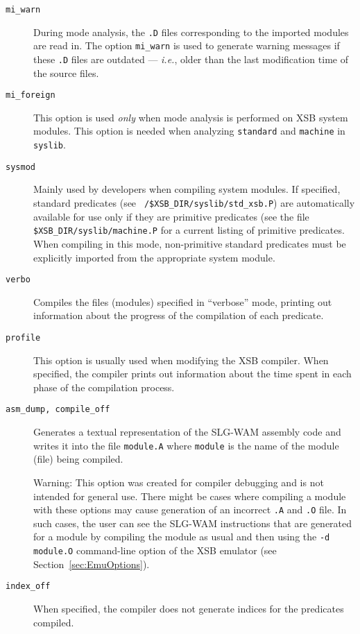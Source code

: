 \begin{description}
\item[{\tt mi\_warn}]
	During mode analysis, the {\tt .D} files corresponding to the
	imported modules are read in. The option {\tt mi\_warn} is used
	to generate warning messages if these {\tt .D} files are 
	outdated --- {\em i.e.}, older
	than the last modification time of the source files.

\item[{\tt mi\_foreign}] This option is used {\em only\/} when mode analysis
	is performed on XSB system modules. This option is
	needed when analyzing {\tt standard} and {\tt machine} in
	{\tt syslib}.


\item[{\tt sysmod}] 
	Mainly used by developers when compiling system modules. If
	specified, standard predicates (see {\tt
	/\$XSB\_DIR/syslib/std\_xsb.P}) are automatically available
	for use only if they are primitive predicates (see the file
	{\tt \$XSB\_DIR/syslib/machine.P} for a current listing of
	primitive predicates.  When compiling in this mode,
	non-primitive standard predicates must be explicitly imported
	from the appropriate system module.
\item[{\tt verbo}] Compiles the files (modules) specified in ``verbose'' mode, 
	printing out information about the progress of the compilation of each 
	predicate.
\item[{\tt profile}] This option is usually used when modifying the
	XSB compiler.  When specified, the compiler prints out
	information about the time spent in each phase of the
	compilation process.

\item[{\tt asm\_dump, compile\_off}] Generates a textual representation of 
	the SLG-WAM assembly code and writes it into the file {\tt module.A}
	where {\tt module} is the name of the module (file) being compiled.  
	
	{\sc Warning:} This option was created for compiler debugging and is
		not intended for general use.  There might be cases where
		compiling a module with these options may cause generation
		of an incorrect {\tt .A} and {\tt .O} file.  In such cases,
		the user can see the SLG-WAM instructions that are
		generated for a module by compiling the module as usual and
		then using the {\tt -d module.O} command-line option of the
		XSB emulator (see Section~\ref{sec:EmuOptions}).
\item[{\tt index\_off}] When specified, the compiler does not generate indices
	for the predicates compiled.  
\end{description}



